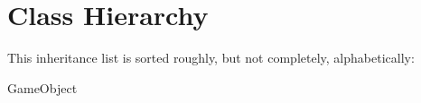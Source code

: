 \section{Class Hierarchy}
This inheritance list is sorted roughly, but not completely, alphabetically\+:\begin{DoxyCompactList}
\item Game\+Object\begin{DoxyCompactList}
\item {}
\end{DoxyCompactList}
\item {}
\end{DoxyCompactList}
